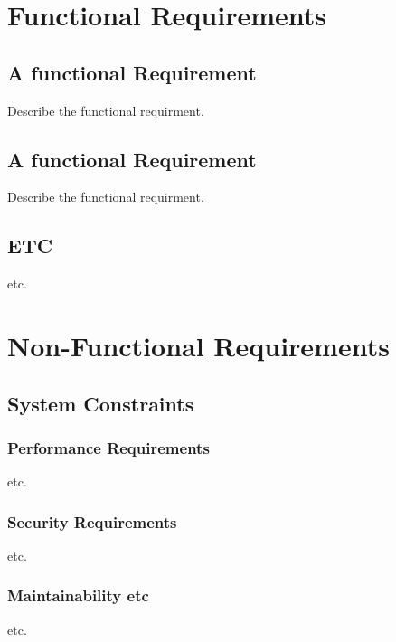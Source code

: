 \documentclass[english,12pt]{scrartcl}
\begin{document}
	\section{Functional Requirements} {
		\subsection{A functional Requirement} {
			Describe the functional requirment.
		}
		\subsection{A functional Requirement} {
			Describe the functional requirment.
		}
		\subsection{ETC} {
			etc.
		}
	}
	\clearpage
	
	\section{Non-Functional Requirements} {
		\subsection{System Constraints} {
			\subsubsection{Performance Requirements} {
				etc.
			}
			
			\subsubsection{Security Requirements} {
				etc.
			}
			
			\subsubsection{Maintainability etc} {
				etc.
			}
		}
	}
	\clearpage
	
	 {
		
	}
	
\end{document}
